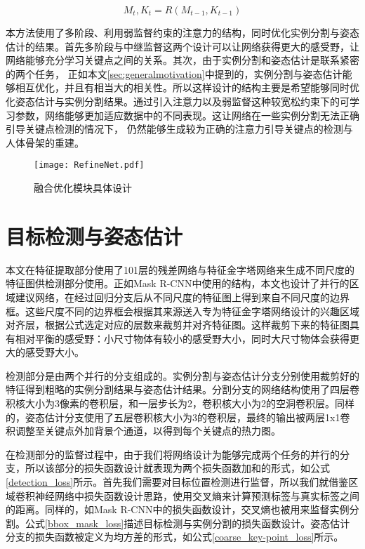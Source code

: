 \begin{equation}
\label{def:refinenet}
M_t, K_t = R(M_{t-1}, K_{t-1})
\end{equation}

本方法使用了多阶段、利用弱监督约束的注意力的结构，同时优化实例分割与姿态估计的结果。首先多阶段与中继监督这两个设计可以让网络获得更大的感受野，让网络能够充分学习关键点之间的关系\cite{wei2016convolutional}。其次，由于实例分割和姿态估计是联系紧密的两个任务， 正如本文\ref{sec:generalmotivation}中提到的，实例分割与姿态估计能够相互优化，并且有相当大的相关性。所以这样设计的结构主要是希望能够同时优化姿态估计与实例分割结果。通过引入注意力以及弱监督这种较宽松约束下的可学习参数，网络能够更加适应数据中的不同表现。这让网络在一些实例分割无法正确引导关键点检测的情况下， 仍然能够生成较为正确的注意力引导关键点的检测与人体骨架的重建。

\begin{figure*}[htbp]	
	\centering
	\texttt{[image: RefineNet.pdf]}
	\caption{融合优化模块具体设计}
	\label{fig:RefineNet}
\end{figure*}

\section{目标检测与姿态估计}
\label{sec:detectionstage}
本文在特征提取部分使用了101层的残差网络与特征金字塔网络来生成不同尺度的特征图供检测部分使用。正如Mask R-CNN\cite{He2017Mask}中使用的结构，本文也设计了并行的区域建议网络，在经过回归分支后从不同尺度的特征图上得到来自不同尺度的边界框。这些尺度不同的边界框会根据其来源送入专为特征金字塔网络设计的兴趣区域对齐层，根据公式选定对应的层数来裁剪并对齐特征图\cite{Lin2016Feature}。这样裁剪下来的特征图具有相对平衡的感受野：小尺寸物体有较小的感受野大小，同时大尺寸物体会获得更大的感受野大小。

检测部分是由两个并行的分支组成的。实例分割与姿态估计分支分别使用裁剪好的特征得到粗略的实例分割结果与姿态估计结果。分割分支的网络结构使用了四层卷积核大小为3像素的卷积层，和一层步长为2，卷积核大小为2的空洞卷积层。同样的，姿态估计分支使用了五层卷积核大小为3的卷积层，最终的输出被两层1x1卷积调整至关键点外加背景个通道，以得到每个关键点的热力图。


在检测部分的监督过程中，由于我们将网络设计为能够完成两个任务的并行的分支，所以该部分的损失函数设计就表现为两个损失函数加和的形式，如公式\eqref{detection_loss}所示。首先我们需要对目标位置检测进行监督，所以我们就借鉴区域卷积神经网络\cite{Girshick_2014_CVPR}中损失函数设计思路，使用交叉熵来计算预测标签与真实标签之间的距离。同样的，如Mask R-CNN\cite{He2017Mask}中的损失函数设计，交叉熵也被用来监督实例分割。公式\eqref{bbox_mask_loss}描述目标检测与实例分割的损失函数设计。姿态估计分支的损失函数被定义为均方差的形式，如公式\eqref{coarse_key-point_loss}所示。

